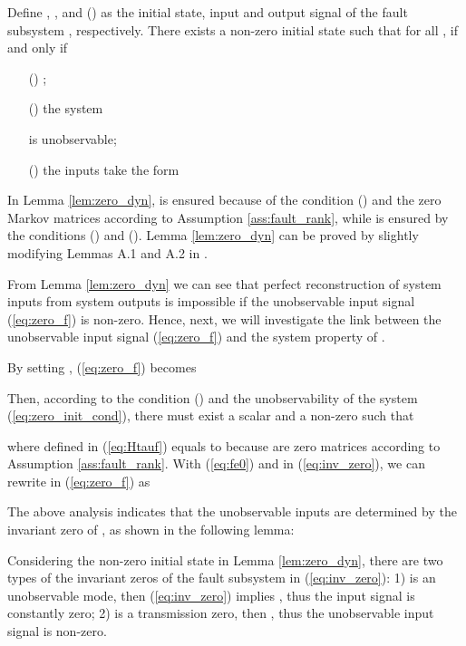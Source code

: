\documentclass[twocolumn]{autart}
\begin{document}
\begin{lem}\label{lem:zero_dyn}
Define , , and  () as the initial state, input and output signal of the fault subsystem , respectively. 
There exists a non-zero initial state  such that  for all , if and only if 
\begin{enumerate}
	\item[(\romannumeral1)] ;
	\item[(\romannumeral2)] the system
		
		is unobservable;
	\item[(\romannumeral3)] the inputs  take the form
		
\end{enumerate}
\end{lem}


In Lemma \ref{lem:zero_dyn},  is ensured because of the condition () and the zero Markov matrices  according to Assumption \ref{ass:fault_rank}, while  is ensured by the conditions () and ().
Lemma \ref{lem:zero_dyn} can be proved by slightly modifying Lemmas A.1 and A.2 in \cite{Kirt2011}.


From Lemma \ref{lem:zero_dyn} we can see that perfect reconstruction of system inputs  from system outputs  is impossible if the unobservable input signal (\ref{eq:zero_f}) is non-zero. Hence, next, we will investigate the link between the unobservable input signal (\ref{eq:zero_f}) and the system property of .


By setting , (\ref{eq:zero_f}) becomes 

Then, according to the condition () and the unobservability of the system (\ref{eq:zero_init_cond}), there must exist a scalar  and a non-zero  such that \cite{Zhoubook1996}
 
where  defined in (\ref{eq:Htauf}) equals to  because  are zero matrices according to Assumption \ref{ass:fault_rank}.
With (\ref{eq:fe0}) and  in (\ref{eq:inv_zero}), we can rewrite  in (\ref{eq:zero_f}) as

The above analysis indicates that the unobservable inputs  are determined by the invariant zero  of 
, as shown in the following lemma:


\begin{lem}\label{lem:null_space_zero}
Considering the non-zero initial state  in Lemma \ref{lem:zero_dyn}, there are two types of the invariant zeros  of the fault subsystem
 in (\ref{eq:inv_zero}): 1) 
 is an unobservable mode, then (\ref{eq:inv_zero}) implies , thus the input signal  is constantly zero; 2)  is a transmission zero, then , thus the  unobservable input signal  is non-zero. 
\end{lem}
\end{document}
